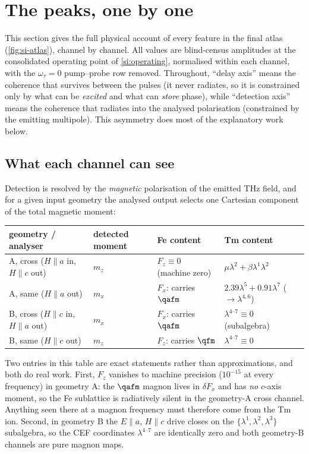 \section{The peaks, one by one}
\label{si:peakbypeak}

This section gives the full physical account of every feature in the
final atlas (\cref{fig:si-atlas}), channel by channel.  All values are
blind-census amplitudes at the consolidated operating point of
\cref{si:operating}, normalised within each channel, with the
$\omega_\tau=0$ pump--probe row removed.  Throughout, ``delay axis''
means the coherence that survives between the pulses (it never
radiates, so it is constrained only by what can be \emph{excited} and
what can \emph{store} phase), while ``detection axis'' means the
coherence that radiates into the analysed polarisation (constrained by
the emitting multipole).  This asymmetry does most of the explanatory
work below.

\subsection{What each channel can see}
\label{si:whatsees}

Detection is resolved by the \emph{magnetic} polarisation of the
emitted THz field, and for a given input geometry the analysed output
selects one Cartesian component of the total magnetic moment:
\begin{center}\small
\renewcommand{\arraystretch}{1.3}
\begin{tabular}{llll}
\toprule
geometry / analyser & detected moment & Fe content & Tm content\\
\midrule
A, cross ($H\!\parallel\!a$ in, $H\!\parallel\!c$ out) & $m_z$ &
  $F_z\equiv0$ (machine zero) & $\mu\lambda^2+\beta\lambda^1\lambda^2$\\
A, same ($H\!\parallel\!a$ out) & $m_x$ &
  $F_x$: carries $\qafm$ & $2.39\lambda^5+0.91\lambda^7$ ($\to\lambda^{4,6}$)\\
B, cross ($H\!\parallel\!c$ in, $H\!\parallel\!a$ out) & $m_x$ &
  $F_x$: carries $\qafm$ & $\lambda^{4\text{--}7}\equiv0$ (subalgebra)\\
B, same ($H\!\parallel\!c$ out) & $m_z$ &
  $F_z$: carries $\qfm$ & $\lambda^{4\text{--}7}\equiv0$\\
\bottomrule
\end{tabular}
\end{center}
Two entries in this table are exact statements rather than
approximations, and both do real work.  First, $F_z$ vanishes to
machine precision ($10^{-15}$ at every frequency) in geometry A: the
$\qafm$ magnon lives in $\delta F_x$ and has \emph{no} $c$-axis moment,
so the Fe sublattice is radiatively silent in the geometry-A cross
channel.  Anything seen there at a magnon frequency must therefore come
from the Tm ion.  Second, in geometry B the $E\!\parallel\!a$,
$H\!\parallel\!c$ drive closes on the $\{\lambda^1,\lambda^2,\lambda^3\}$
subalgebra, so the CEF coordinates $\lambda^{4\text{--}7}$ are
identically zero and both geometry-B channels are pure magnon maps.

